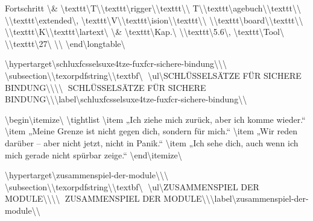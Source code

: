 Fortschritt \textbackslash{}& \textbackslash{}texttt\textbackslash{}{T\textbackslash{}}\textbackslash{}texttt\textbackslash{}{rigger\textbackslash{}}\textbackslash{}texttt\textbackslash{}{\textbackslash{} T\textbackslash{}}\textbackslash{}texttt\textbackslash{}{agebuch\textbackslash{}}\textbackslash{}texttt\textbackslash{}{\textbackslash{} \textbackslash{}}\textbackslash{}texttt\textbackslash{}{extended\textbackslash{}}, \textbackslash{}texttt\textbackslash{}{V\textbackslash{}}\textbackslash{}texttt\textbackslash{}{ision\textbackslash{}}\textbackslash{}texttt\textbackslash{}{\textbackslash{} \textbackslash{}}\textbackslash{}texttt\textbackslash{}{board\textbackslash{}}\textbackslash{}texttt\textbackslash{}{\textbackslash{} \textbackslash{}}\textbackslash{}texttt\textbackslash{}{K\textbackslash{}}\textbackslash{}texttt\textbackslash{}{lartext\textbackslash{}} \textbackslash{}& \textbackslash{}texttt\textbackslash{}{Kap.\textbackslash{} \textbackslash{}}\textbackslash{}texttt\textbackslash{}{5.6\textbackslash{}}, \textbackslash{}texttt\textbackslash{}{Tool\textbackslash{} \textbackslash{}}\textbackslash{}texttt\textbackslash{}{27\textbackslash{}} \textbackslash{}\textbackslash{}
\textbackslash{}end\textbackslash{}{longtable\textbackslash{}}

\textbackslash{}hypertarget\textbackslash{}{schluxfcsselsuxe4tze-fuxfcr-sichere-bindung\textbackslash{}}\textbackslash{}{\textbackslash{}%
\textbackslash{}subsection\textbackslash{}{\textbackslash{}texorpdfstring\textbackslash{}{\textbackslash{}textbf\textbackslash{}{💬 \textbackslash{}ul\textbackslash{}{SCHLÜSSELSÄTZE FÜR SICHERE BINDUNG\textbackslash{}}\textbackslash{}}\textbackslash{}}\textbackslash{}{💬 SCHLÜSSELSÄTZE FÜR SICHERE BINDUNG\textbackslash{}}\textbackslash{}}\textbackslash{}label\textbackslash{}{schluxfcsselsuxe4tze-fuxfcr-sichere-bindung\textbackslash{}}\textbackslash{}}

\textbackslash{}begin\textbackslash{}{itemize\textbackslash{}}
\textbackslash{}tightlist
\textbackslash{}item
  „Ich ziehe mich zurück, aber ich komme wieder.``
\textbackslash{}item
  „Meine Grenze ist nicht gegen dich, sondern für mich.``
\textbackslash{}item
  „Wir reden darüber -- aber nicht jetzt, nicht in Panik.``
\textbackslash{}item
  „Ich sehe dich, auch wenn ich mich gerade nicht spürbar zeige.``
\textbackslash{}end\textbackslash{}{itemize\textbackslash{}}

\textbackslash{}hypertarget\textbackslash{}{zusammenspiel-der-module\textbackslash{}}\textbackslash{}{\textbackslash{}%
\textbackslash{}subsection\textbackslash{}{\textbackslash{}texorpdfstring\textbackslash{}{\textbackslash{}textbf\textbackslash{}{🔗 \textbackslash{}ul\textbackslash{}{ZUSAMMENSPIEL DER MODULE\textbackslash{}}\textbackslash{}}\textbackslash{}}\textbackslash{}{🔗 ZUSAMMENSPIEL DER MODULE\textbackslash{}}\textbackslash{}}\textbackslash{}label\textbackslash{}{zusammenspiel-der-module\textbackslash{}}\textbackslash{}}

